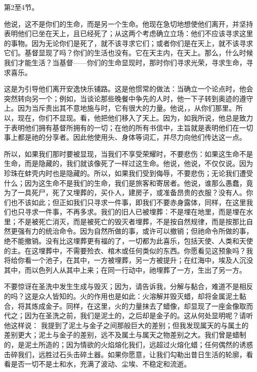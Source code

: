 第2至4节。\par

他说，这不是你们的生命，而是另一个生命。他现在急切地想使他们离开，并坚持表明他们已坐在天上，且已经死了；从这两个考虑确立立场：他们不应该寻求这里的事物。因为无论你们是死了，就不该寻求它们；或者你们是在天上，就不该寻求它们。基督显现了吗？你们的生活也没有。它在天主内，在天上。那么，什么时候我们才能生活？当基督——你们的生命显现时，那时你们寻求光荣，寻求生命，寻求喜乐。\par

这是为引导他们离开安逸快乐铺路。这是他惯常的做法：当确立一个论点时，他会突然转向另一个；例如，当谈论那些晚餐中争先的人时，他一下子转到奥迹的遵守上。因为当斥责出其不意地施与时，它有很大的力量。他说，，从你们那里。所以，现在，你们不显现。看，他把他们移入了天上。因为，如我所说，他总是致力于表明他们拥有基督所拥有的一切；在他的所有书信中，主旨就是表明他们在一切事上都是祂的分享者。因此他使用头、身体等词汇，并尽力向他们传达这一点。\par

所以，如果我们那时要被显现，当我们不享受荣耀时，不要悲伤：如果这生命不是生命，而是隐藏的，我们就该像死了一样过这生命。他说，他说，不仅仅说。因为珍珠在蚌壳内时也是隐藏的。所以，如果我们受到侮辱，不要悲伤；无论我们遭受什么；因为这生命不是我们的生命，我们是旅客和寄居者。他说，谁那么愚蠢，竟为了一具死尸，死了又埋葬的，买仆人，建房子，或准备昂贵的衣服？没有人。你们也不该如此；但正如我们只寻求一件事，即我们不要赤身露体，同样，在这里我们也只寻求一件事，不再多求。我们的旧人已被埋葬：不是埋在地里，而是埋在水里；不是被死亡消灭，而是被死亡的毁灭者埋葬，不是按自然规律，而是按那比自然更强有力的统治命令。因为自然所做的事，或许可以撤销；但祂命令所做的事，绝不能撤销。没有比这埋葬更有福的了，一切都为此喜乐，包括天使、人类和天使的主。在这埋葬中，不需要殓衣、棺木或任何类似的东西。你愿看见这预象吗？我将给你看一个池子，在其中，一方被埋葬，另一方被提升；在红海中，埃及人沉没其中，而以色列人从其中上来；在同一行动中，祂埋葬了一方，生出了另一方。\par

不要惊讶在圣洗中发生生成与毁灭；因为，请告诉我，分解与黏合，难道不是相反的吗？这是众人皆知的。火的作用也是如此：火溶解并毁灭蜡，却将金属泥土黏合，将其炼成金子。同样，在这里，火的力量抹去了蜡像，却显现了一座金像取而代之；因为在圣洗之前，我们是泥土的，之后却是金子的。这从何处显明呢？请听他这样说：  我提到了泥土与金子之间那般巨大的差别；但我发现属天的与属土的差别更大；泥土与金子的差别，远不及属土与属天之物差别之大。我们曾是蜡制的，是泥土所造的；因为情欲的火焰熔化我们，远超过火熔化蜡；任何偶然的诱惑击碎我们，远胜过石头击碎土器。如果你愿意，让我们勾勒出昔日生活的轮廓，看看是否一切不是土和水，充满了波动、尘埃、不稳定和流逝。\par

